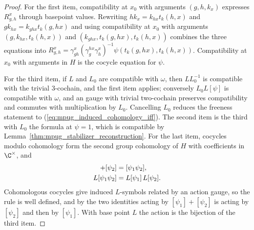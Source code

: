 \begin{proof}\leanok
    For the first item, compatibility at $x_0$ with arguments
    $(g,h,k_x)$ expresses $R^x_{g,h}$ through basepoint values. Rewriting
    $hk_x=k_{hx}t_k(h,x)$ and $gk_{hx}=k_{ghx}t_k(g,hx)$ and using
    compatibility at $x_0$ with arguments $(g,k_{hx},t_k(h,x))$ and
    $(k_{ghx},t_k(g,hx),t_k(h,x))$ combines the three equations into
    $R^x_{g,h}=\gamma^x_{gh}(\gamma^{hx}_g\gamma^x_h)^{-1}
        \psi(t_k(g,hx),t_k(h,x))$. Compatibility at $x_0$ with arguments in
    $H$ is the cocycle equation for $\psi$.

    For the third item, if $L$ and $L_0$ are compatible with $\omega$,
    then $LL_0^{-1}$ is compatible with the trivial $3$-cochain, and the first
    item applies; conversely $L_0L[\psi]$ is compatible with $\omega$, and an
    gauge with trivial two-cochain preserves compatibility and
    commutes with multiplication by $L_0$. Cancelling $L_0$ reduces the
    freeness statement to (\ref{eq:mpug_induced_cohomology_iff}). The second
    item is the third with $L_0$ the formula at $\psi=1$, which is
    compatible by Lemma~\ref{thm:mpug_stabilizer_reconstruction}.
    For the last item, cocycles modulo cohomology form the second group
    cohomology of $H$ with coefficients in $\C^\times$, and
    \begin{align}
        [\psi_1]+[\psi_2] & =[\psi_1\psi_2],
        \notag                                     \\
        L[\psi_1\psi_2]   & =L[\psi_1]\,L[\psi_2].
        \notag
    \end{align}
    Cohomologous cocycles give induced $L$-symbols related by an action
    gauge, so the rule is well defined, and by the two identities acting by
    $[\psi_1]+[\psi_2]$ is acting by $[\psi_2]$ and then by $[\psi_1]$. With
    base point $L$ the action is the bijection of the third item.
\end{proof}

